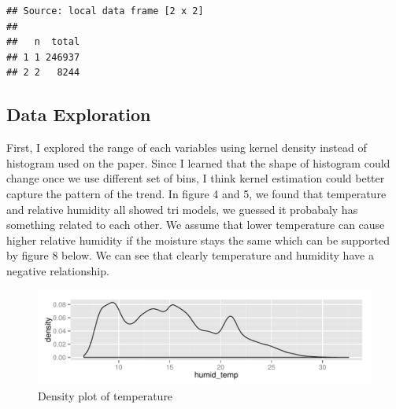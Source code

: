\documentclass{article}\usepackage[]{graphicx}\usepackage[]{color}
\makeatletter
\def\maxwidth{ %
  \ifdim\Gin@nat@width>\linewidth
    \linewidth
  \else
    \Gin@nat@width
  \fi
}
\newenvironment{kframe}{%
 \def\at@end@of@kframe{}%
 \ifinner\ifhmode%
  \def\at@end@of@kframe{\end{minipage}}%
  \begin{minipage}{\columnwidth}%
 \fi\fi%
 \def\FrameCommand##1{\hskip\@totalleftmargin \hskip-\fboxsep
 \colorbox{shadecolor}{##1}\hskip-\fboxsep
     \hskip-\linewidth \hskip-\@totalleftmargin \hskip\columnwidth}%
 \MakeFramed {\advance\hsize-\width
   \@totalleftmargin\z@ \linewidth\hsize
   \@setminipage}}%
 {\par\unskip\endMakeFramed%
 \at@end@of@kframe}
\newenvironment{knitrout}{}{} %
\makeatother
\begin{document}
\begin{knitrout}
\color{fgcolor}\begin{kframe}
\begin{verbatim}
## Source: local data frame [2 x 2]
## 
##   n  total
## 1 1 246937
## 2 2   8244
\end{verbatim}
\end{kframe}
\end{knitrout}
\subsection{Data Exploration}
First, I explored the range of each variables using kernel density instead of histogram used on the paper. Since I learned that the shape of histogram could change once we use different set of bins, I think kernel estimation could better capture the pattern of the trend. In figure 4 and 5, we found that temperature and relative humidity all showed tri models, we guessed it probabaly has something
related to each other. We assume that lower temperature can cause higher relative humidity
if the moisture stays the same which can be supported by figure 8 below. We can see that clearly temperature and humidity have a negative relationship.

\begin{knitrout}
\color{fgcolor}\begin{figure}[h!]

{\centering \includegraphics[width=\maxwidth]{figure/addfigure4-1} 

}

\caption[Density plot of temperature]{Density plot of temperature}\label{fig:addfigure4}
\end{figure}


\end{knitrout}
\end{document}
